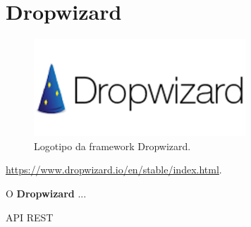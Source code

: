 \section{Dropwizard}
\label{subsec:dropwizard}

\begin{figure}[H]
    \centering
    \includegraphics[scale=0.45]{images/dropwizard.png}
    \caption{Logotipo da framework Dropwizard.}
    \label{fig:dropwizard}
\end{figure}

\href{https://www.dropwizard.io/en/stable/index.html}{https://www.dropwizard.io/en/stable/index.html}.

\hspace{5mm} O \textbf{Dropwizard} ...

API REST
